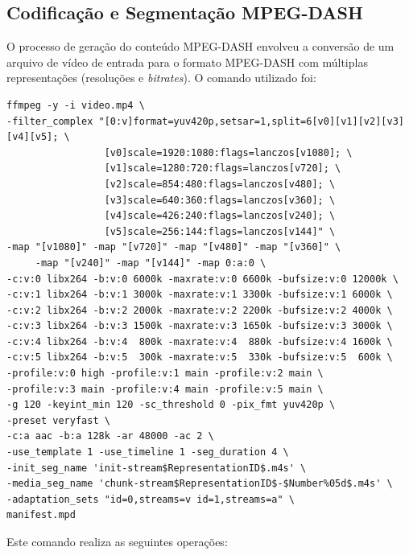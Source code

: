 \subsection{Codificação e Segmentação MPEG-DASH}

O processo de geração do conteúdo MPEG-DASH envolveu a conversão de um arquivo de vídeo de entrada para o formato MPEG-DASH com múltiplas representações (resoluções e \textit{bitrates}). O comando utilizado foi:

\begin{verbatim}
ffmpeg -y -i video.mp4 \
-filter_complex "[0:v]format=yuv420p,setsar=1,split=6[v0][v1][v2][v3][v4][v5]; \
                 [v0]scale=1920:1080:flags=lanczos[v1080]; \
                 [v1]scale=1280:720:flags=lanczos[v720]; \
                 [v2]scale=854:480:flags=lanczos[v480]; \
                 [v3]scale=640:360:flags=lanczos[v360]; \
                 [v4]scale=426:240:flags=lanczos[v240]; \
                 [v5]scale=256:144:flags=lanczos[v144]" \
-map "[v1080]" -map "[v720]" -map "[v480]" -map "[v360]" \
     -map "[v240]" -map "[v144]" -map 0:a:0 \
-c:v:0 libx264 -b:v:0 6000k -maxrate:v:0 6600k -bufsize:v:0 12000k \
-c:v:1 libx264 -b:v:1 3000k -maxrate:v:1 3300k -bufsize:v:1 6000k \
-c:v:2 libx264 -b:v:2 2000k -maxrate:v:2 2200k -bufsize:v:2 4000k \
-c:v:3 libx264 -b:v:3 1500k -maxrate:v:3 1650k -bufsize:v:3 3000k \
-c:v:4 libx264 -b:v:4  800k -maxrate:v:4  880k -bufsize:v:4 1600k \
-c:v:5 libx264 -b:v:5  300k -maxrate:v:5  330k -bufsize:v:5  600k \
-profile:v:0 high -profile:v:1 main -profile:v:2 main \
-profile:v:3 main -profile:v:4 main -profile:v:5 main \
-g 120 -keyint_min 120 -sc_threshold 0 -pix_fmt yuv420p \
-preset veryfast \
-c:a aac -b:a 128k -ar 48000 -ac 2 \
-use_template 1 -use_timeline 1 -seg_duration 4 \
-init_seg_name 'init-stream$RepresentationID$.m4s' \
-media_seg_name 'chunk-stream$RepresentationID$-$Number%05d$.m4s' \
-adaptation_sets "id=0,streams=v id=1,streams=a" \
manifest.mpd
\end{verbatim}

Este comando realiza as seguintes operações:

